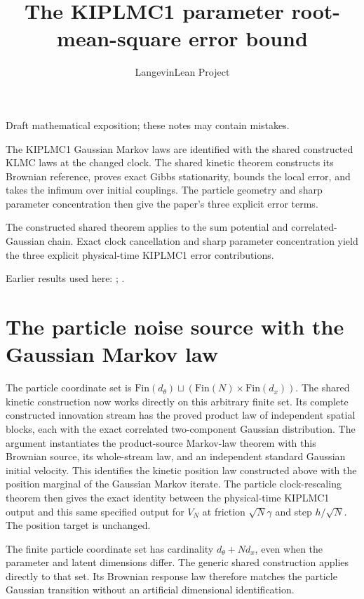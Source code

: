 \documentclass[11pt,a4paper]{article}
\title{\texorpdfstring{The KIPLMC1 parameter root-mean-square error bound}{The KIPLMC1 parameter root-mean-square error bound}}
\author{LangevinLean Project}
\date{}
\begin{document}
\maketitle
Draft mathematical exposition; these notes may contain mistakes.


The KIPLMC1 Gaussian Markov laws are identified with the shared constructed KLMC laws at the changed clock. The shared kinetic theorem constructs its Brownian reference, proves exact Gibbs stationarity, bounds the local error, and takes the infimum over initial couplings. The particle geometry and sharp parameter concentration then give the paper’s three explicit error terms.



The constructed shared theorem applies to the sum potential and correlated-Gaussian chain. Exact clock cancellation and sharp parameter concentration yield the three explicit physical-time KIPLMC1 error contributions.



Earlier results used here: \cite[Section~3.114]{LangevinLean2026Kinetic}; \cite[Section~3.57]{LangevinLean2026Kinetic}.

\section{\texorpdfstring{The particle noise source with the Gaussian Markov law}{The particle noise source with the Gaussian Markov law}}


The particle coordinate set is \(\mathrm{Fin}(d_\theta)\sqcup(\mathrm{Fin}(N)\times\mathrm{Fin}(d_x))\). The shared kinetic construction now works directly on this arbitrary finite set. Its complete constructed innovation stream has the proved product law of independent spatial blocks, each with the exact correlated two-component Gaussian distribution. The argument instantiates the product-source Markov-law theorem with this Brownian source, its whole-stream law, and an independent standard Gaussian initial velocity. This identifies the kinetic position law constructed above with the position marginal of the Gaussian Markov iterate. The particle clock-rescaling theorem then gives the exact identity between the physical-time KIPLMC1 output and this same specified output for \(V_N\) at friction \(\sqrt N\gamma\) and step \(h/\sqrt N\). The position target is unchanged.



The finite particle coordinate set has cardinality \(d_\theta+Nd_x\), even when the parameter and latent dimensions differ. The generic shared construction applies directly to that set. Its Brownian response law therefore matches the particle Gaussian transition without an artificial dimensional identification.
\end{document}
